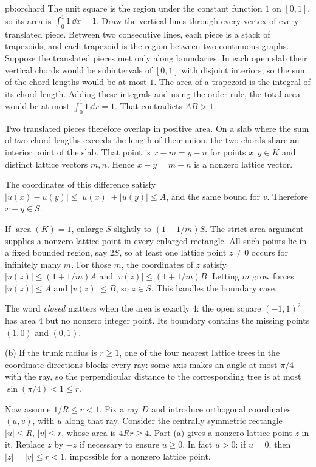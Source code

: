 \begin{solution}{pb:orchard}
The unit square is the region under the constant function $1$ on $[0,1]$, so its area is $\int_0^1 1\,\dd x=1$. Draw the vertical lines through every vertex of every translated piece. Between two consecutive lines, each piece is a stack of trapezoids, and each trapezoid is the region between two continuous graphs. Suppose the translated pieces met only along boundaries. In each open slab their vertical chords would be subintervals of $[0,1]$ with disjoint interiors, so the sum of the chord lengths would be at most $1$. The area of a trapezoid is the integral of its chord length. Adding these integrals and using the order rule, the total area would be at most $\int_0^1 1\,\dd x=1$. That contradicts $AB>1$.

Two translated pieces therefore overlap in positive area. On a slab where the sum of two chord lengths exceeds the length of their union, the two chords share an interior point of the slab. That point is $x-m=y-n$ for points $x,y\in K$ and distinct lattice vectors $m,n$. Hence $x-y=m-n$ is a nonzero lattice vector.

The coordinates of this difference satisfy $|u(x)-u(y)|\le|u(x)|+|u(y)|\le A$, and the same bound for $v$. Therefore $x-y\in S$.

If $\operatorname{area}(K)=1$, enlarge $S$ slightly to $(1+1/m)S$. The strict-area argument supplies a nonzero lattice point in every enlarged rectangle. All such points lie in a fixed bounded region, say $2S$, so at least one lattice point $z\ne0$ occurs for infinitely many $m$. For those $m$, the coordinates of $z$ satisfy $|u(z)|\le(1+1/m)A$ and $|v(z)|\le(1+1/m)B$. Letting $m$ grow forces $|u(z)|\le A$ and $|v(z)|\le B$, so $z\in S$. This handles the boundary case.

The word \emph{closed} matters when the area is exactly $4$: the open square $(-1,1)^2$ has area $4$ but no nonzero integer point. Its boundary contains the missing points $(1,0)$ and $(0,1)$.

(b) If the trunk radius is $r\ge1$, one of the four nearest lattice trees in the coordinate directions blocks every ray: some axis makes an angle at most $\pi/4$ with the ray, so the perpendicular distance to the corresponding tree is at most $\sin(\pi/4)<1\le r$.

Now assume $1/R\le r<1$. Fix a ray $D$ and introduce orthogonal coordinates $(u,v)$, with $u$ along that ray. Consider the centrally symmetric rectangle $|u|\le R$, $|v|\le r$, whose area is $4Rr\ge4$. Part (a) gives a nonzero lattice point $z$ in it. Replace $z$ by $-z$ if necessary to ensure $u\ge0$. In fact $u>0$: if $u=0$, then $|z|=|v|\le r<1$, impossible for a nonzero lattice point.


\end{solution}
